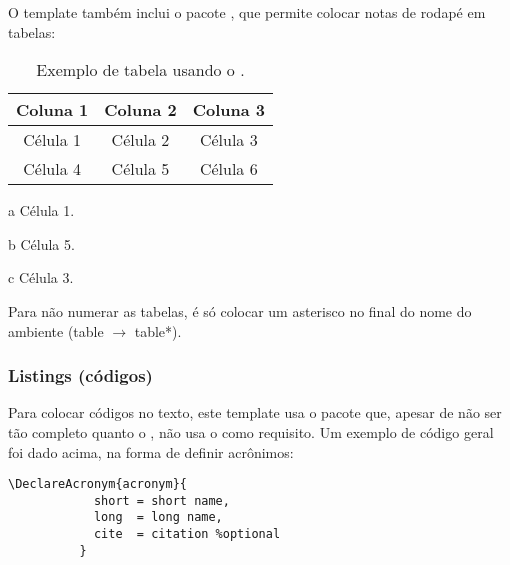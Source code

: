         O template também inclui o pacote , que permite colocar notas de rodapé em tabelas:
        \begin{table}[h!]
          \centering
          \caption{Exemplo de tabela usando o .}
          \label{tab:ex_5}
          \begin{threeparttable}
            \begin{tabular}{ccc}
              \toprule
              \textbf{Coluna 1} & \textbf{Coluna 2} & \textbf{Coluna 3} \\ \midrule
              Célula 1\tnote{a} & Célula 2          & Célula 3\tnote{c} \\ 
              Célula 4          & Célula 5\tnote{b} & Célula 6          \\ 
              \bottomrule
            \end{tabular}
            \begin{tablenotes}
              \item[a] Célula 1.
              \item[b] Célula 5.
              \item[c] Célula 3.
            \end{tablenotes}
          \end{threeparttable}
        \end{table}

        Para não numerar as tabelas, é só colocar um asterisco no final do nome do ambiente (table $\rightarrow$ table*).

      \subsubsection{Listings (códigos)}
        Para colocar códigos no texto, este template usa o pacote  que, apesar de não ser tão completo quanto o , não usa o  como requisito. Um exemplo de código geral foi dado acima, na forma de definir acrônimos:
        \begin{lstlisting}[autogobble]
          \DeclareAcronym{acronym}{
            short = short name,
            long  = long name,
            cite  = citation %optional
          }
        \end{lstlisting}


